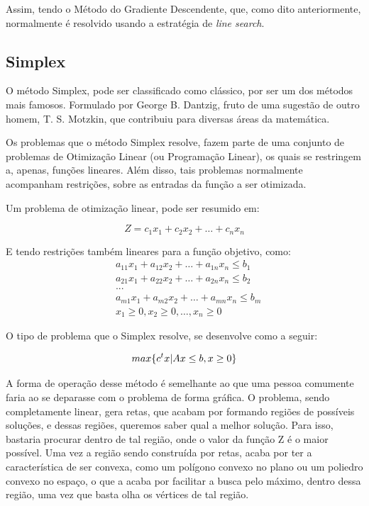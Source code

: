 Assim, tendo o Método do Gradiente Descendente, que, como dito anteriormente,
normalmente é resolvido usando a estratégia de \textit{line search}.


\subsection{Simplex}

\hspace{0.8cm}
O método Simplex, pode ser classificado como clássico, por ser um
dos métodos mais famosos. Formulado por George B. Dantzig, fruto de uma
sugestão de outro homem, T. S. Motzkin, que contribuiu para diversas áreas da
matemática.

Os problemas que o método Simplex resolve, fazem parte de uma conjunto de
problemas de Otimização Linear (ou Programação Linear), os quais se restringem
a, apenas, funções lineares. Além disso, tais problemas normalmente acompanham
restrições, sobre as entradas da função a ser otimizada.

Um problema de otimização linear, pode ser resumido em:

\begin{equation}
        Z = c_1x_1 + c_2x_2 + … + c_nx_n
\end{equation}

E tendo restrições também lineares para a função objetivo, como:
\begin{equation}
    \begin{split}
        &   a_{11}x_1 + a_{12}x_2 + … + a_{1n}x_n \leq b_1\\
        &   a_{21}x_1 + a_{22}x_2 + … + a_{2n}x_n \leq b_2\\
        &   ...\\
        &   a_{m1}x_1 + a_{m2}x_2 + … + a_{mn}x_n \leq b_m\\
        &   x_1 \geq 0, x_2 \geq 0, …, x_n \geq 0
    \end{split}
\end{equation}

O tipo de problema que o Simplex resolve, se desenvolve como a seguir:

\begin{equation}
        max \{c^tx | Ax \leq b, x \geq 0\}\\
\end{equation}


A forma de operação desse método é semelhante ao que uma pessoa comumente faria
ao se deparasse com o problema de forma gráfica. O problema, sendo
completamente linear, gera retas, que acabam por formando regiões de
possíveis soluções, e dessas regiões, queremos saber qual a melhor solução.
Para isso, bastaria procurar dentro de tal região, onde o valor da função Z é o
maior possível. Uma vez a região sendo construída por retas, acaba por
ter a característica de ser convexa, como um polígono convexo no plano ou um
poliedro convexo no espaço, o que a acaba por facilitar a busca pelo máximo,
dentro dessa região, uma vez que basta olha os vértices de tal região.

